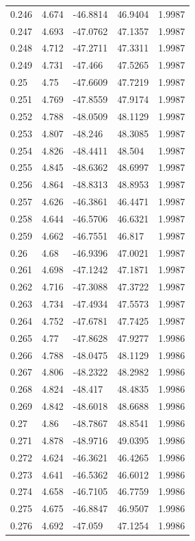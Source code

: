 \begin{tabular}{lllll}
0.246 & 4.674 & -46.8814 & 46.9404 & 1.9987 \\
0.247 & 4.693 & -47.0762 & 47.1357 & 1.9987 \\
0.248 & 4.712 & -47.2711 & 47.3311 & 1.9987 \\
0.249 & 4.731 & -47.466 & 47.5265 & 1.9987 \\
0.25 & 4.75 & -47.6609 & 47.7219 & 1.9987 \\
0.251 & 4.769 & -47.8559 & 47.9174 & 1.9987 \\
0.252 & 4.788 & -48.0509 & 48.1129 & 1.9987 \\
0.253 & 4.807 & -48.246 & 48.3085 & 1.9987 \\
0.254 & 4.826 & -48.4411 & 48.504 & 1.9987 \\
0.255 & 4.845 & -48.6362 & 48.6997 & 1.9987 \\
0.256 & 4.864 & -48.8313 & 48.8953 & 1.9987 \\
0.257 & 4.626 & -46.3861 & 46.4471 & 1.9987 \\
0.258 & 4.644 & -46.5706 & 46.6321 & 1.9987 \\
0.259 & 4.662 & -46.7551 & 46.817 & 1.9987 \\
0.26 & 4.68 & -46.9396 & 47.0021 & 1.9987 \\
0.261 & 4.698 & -47.1242 & 47.1871 & 1.9987 \\
0.262 & 4.716 & -47.3088 & 47.3722 & 1.9987 \\
0.263 & 4.734 & -47.4934 & 47.5573 & 1.9987 \\
0.264 & 4.752 & -47.6781 & 47.7425 & 1.9987 \\
0.265 & 4.77 & -47.8628 & 47.9277 & 1.9986 \\
0.266 & 4.788 & -48.0475 & 48.1129 & 1.9986 \\
0.267 & 4.806 & -48.2322 & 48.2982 & 1.9986 \\
0.268 & 4.824 & -48.417 & 48.4835 & 1.9986 \\
0.269 & 4.842 & -48.6018 & 48.6688 & 1.9986 \\
0.27 & 4.86 & -48.7867 & 48.8541 & 1.9986 \\
0.271 & 4.878 & -48.9716 & 49.0395 & 1.9986 \\
0.272 & 4.624 & -46.3621 & 46.4265 & 1.9986 \\
0.273 & 4.641 & -46.5362 & 46.6012 & 1.9986 \\
0.274 & 4.658 & -46.7105 & 46.7759 & 1.9986 \\
0.275 & 4.675 & -46.8847 & 46.9507 & 1.9986 \\
0.276 & 4.692 & -47.059 & 47.1254 & 1.9986 \\

\end{tabular}
